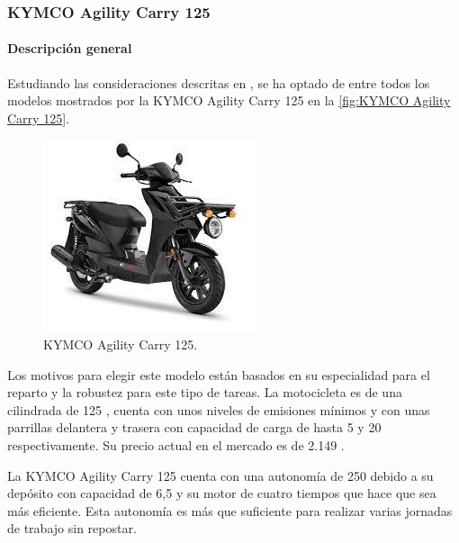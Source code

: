 \subsubsection{KYMCO Agility Carry 125}

\paragraph{Descripción general} 
Estudiando las consideraciones descritas en , se ha optado de entre todos los modelos mostrados por la KYMCO Agility Carry 125 en la \autoref{fig:KYMCO Agility Carry 125}. 

\begin{figure}[h]
    \centering
    \includegraphics[scale = 0.8]{archivos/KYMCO Agility Carry 125.jpg}
    \caption{KYMCO Agility Carry 125.}
    \label{fig:KYMCO Agility Carry 125}
\end{figure}

Los motivos para elegir este modelo están basados en su especialidad para el reparto y la robustez para este tipo de tareas. La motocicleta es de una cilindrada de 125 , cuenta con unos niveles de emisiones mínimos y con unas parrillas delantera y trasera con capacidad de carga de hasta 5  y 20  respectivamente. Su precio actual en el mercado es de 2.149 .

La KYMCO Agility Carry 125 cuenta con una autonomía de 250  debido a su depósito con capacidad de 6,5  y su motor de cuatro tiempos que hace que sea más eficiente. Esta autonomía es más que suficiente para realizar varias jornadas de trabajo sin repostar.

